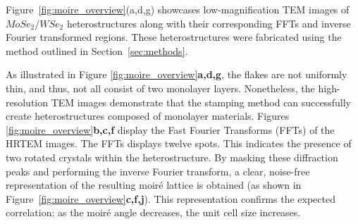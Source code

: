 Figure~\ref{fig:moire_overview}(a,d,g) showcases low-magnification TEM images of $MoSe_2$/$WSe_2$ heterostructures along with their corresponding FFTs and inverse Fourier transformed regions.
%
These heterostructures were fabricated using the method outlined in Section~\ref{sec:methods}. 
%

As illustrated in Figure \ref{fig:moire_overview}\textbf{a,d,g}, the flakes are not uniformly thin, and thus, not all consist of two monolayer layers.
%
Nonetheless, the high-resolution TEM images demonstrate that the stamping method can successfully create heterostructures composed of monolayer materials. 
%
Figures \ref{fig:moire_overview}\textbf{b,c,f} display the Fast Fourier Transforms (FFTs) of the HRTEM images. The FFTs displays twelve spots. This indicates the presence of two rotated crystals within the heterostructure.
%
By masking these diffraction peaks and performing the inverse Fourier transform, a clear, noise-free representation of the resulting moiré lattice is obtained (as shown in Figure~\ref{fig:moire_overview}\textbf{c,f,j}). This representation confirms the expected correlation: as the moiré angle decreases, the unit cell size increases. 

